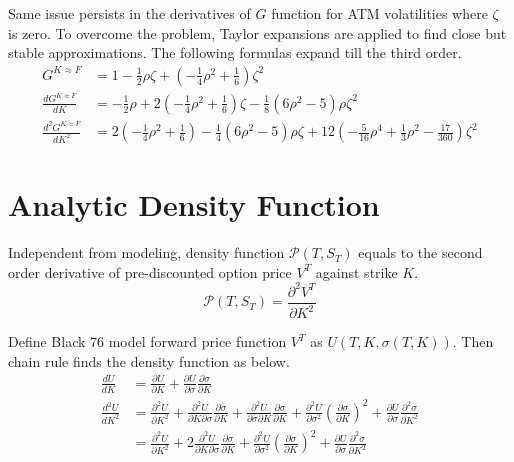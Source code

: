 \documentclass{article}
\begin{document}
Same issue persists in the derivatives of $ G $ function for ATM volatilities where $ \zeta $ is zero.
To overcome the problem, Taylor expansions are applied to find close but stable approximations.
The following formulas expand till the third order.
\begin{subequations}
    \begin{align}
        G^{K \approx F} &= 1 - \frac{1}{2} \rho \zeta + \left(-\frac{1}{4} \rho^2 + \frac{1}{6}\right) \zeta^2 \\
        \frac{d G^{K \approx F}}{d K} &= -\frac{1}{2} \rho  + 2 \left(-\frac{1}{4} \rho^2 + \frac{1}{6}\right) \zeta - \frac{1}{8} \left(6 \rho^2 - 5\right) \rho \zeta^2 \\
        \frac{d^2 G^{K \approx F}}{d K^2} &= 2 \left(-\frac{1}{4} \rho^2 + \frac{1}{6}\right) - \frac{1}{4} \left(6 \rho^2 - 5\right) \rho \zeta + 12 \left(-\frac{5}{16} \rho^4 + \frac{1}{3} \rho^2 - \frac{17}{360}\right) \zeta^2
    \end{align}
\end{subequations}


\section{Analytic Density Function}

Independent from modeling, density function $ \mathcal{P}\left(T, S_T\right) $ equals to the second order derivative of pre-discounted option price $ V^T $ against strike $ K $.
\begin{equation}
    \mathcal{P}\left(T, S_T\right) = \frac{\partial^2 V^T}{\partial K^2}
\end{equation}

Define Black 76 model forward price function $ V^T $ as $ U\left(T, K, \sigma(T, K)\right) $.
Then chain rule finds the density function as below.
\begin{align}
    \frac{d U}{d K} &= \frac{\partial U}{\partial K} + \frac{\partial U}{\partial \sigma} \frac{\partial \sigma}{\partial K} \\
    \frac{d^2 U}{d K^2} &= \frac{\partial^2 U}{\partial K^2} + \frac{\partial^2 U}{\partial K \partial \sigma} \frac{\partial \sigma}{\partial K}  + \frac{\partial^2 U}{\partial \sigma \partial K} \frac{\partial \sigma}{\partial K} + \frac{\partial^2 U}{\partial \sigma^2} \left(\frac{\partial \sigma}{\partial K}\right)^2 + \frac{\partial U}{\partial \sigma} \frac{\partial^2 \sigma}{\partial K^2} \nonumber \\
    &= \frac{\partial^2 U}{\partial K^2} + 2 \frac{\partial^2 U}{\partial K \partial \sigma} \frac{\partial \sigma}{\partial K} + \frac{\partial^2 U}{\partial \sigma^2} \left(\frac{\partial \sigma}{\partial K}\right)^2 + \frac{\partial U}{\partial \sigma} \frac{\partial^2 \sigma}{\partial K^2} \label{d2U_per_dK2}
\end{align}
\end{document}
